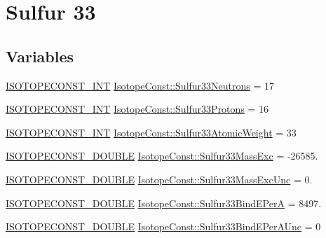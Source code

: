 \hypertarget{group___isotope_const-_sulfur-_s33}{}\section{Sulfur 33}
\label{group___isotope_const-_sulfur-_s33}
\subsection*{Variables}
\begin{DoxyCompactItemize}
\item 
\mbox{\hyperlink{group___isotope_const-_macros_ga5f18360b3e99483a35c32d789e62621c}{I\+S\+O\+T\+O\+P\+E\+C\+O\+N\+S\+T\+\_\+\+I\+NT}} \mbox{\hyperlink{group___isotope_const-_sulfur-_s33_ga18b5d01b14fd8733eec20ef9f10093d9}{Isotope\+Const\+::\+Sulfur33\+Neutrons}} = 17
\item 
\mbox{\hyperlink{group___isotope_const-_macros_ga5f18360b3e99483a35c32d789e62621c}{I\+S\+O\+T\+O\+P\+E\+C\+O\+N\+S\+T\+\_\+\+I\+NT}} \mbox{\hyperlink{group___isotope_const-_sulfur-_s33_gaa3c6580a5931a6566dbdd20283a1c02a}{Isotope\+Const\+::\+Sulfur33\+Protons}} = 16
\item 
\mbox{\hyperlink{group___isotope_const-_macros_ga5f18360b3e99483a35c32d789e62621c}{I\+S\+O\+T\+O\+P\+E\+C\+O\+N\+S\+T\+\_\+\+I\+NT}} \mbox{\hyperlink{group___isotope_const-_sulfur-_s33_ga674be6ce647896ee753c75655993103c}{Isotope\+Const\+::\+Sulfur33\+Atomic\+Weight}} = 33
\item 
\mbox{\hyperlink{group___isotope_const-_macros_ga8f45a7272ce02c0b4c65c44636ed719a}{I\+S\+O\+T\+O\+P\+E\+C\+O\+N\+S\+T\+\_\+\+D\+O\+U\+B\+LE}} \mbox{\hyperlink{group___isotope_const-_sulfur-_s33_ga17e4e2ae4d121834a5676e0c3527b830}{Isotope\+Const\+::\+Sulfur33\+Mass\+Exc}} = -\/26585.
\item 
\mbox{\hyperlink{group___isotope_const-_macros_ga8f45a7272ce02c0b4c65c44636ed719a}{I\+S\+O\+T\+O\+P\+E\+C\+O\+N\+S\+T\+\_\+\+D\+O\+U\+B\+LE}} \mbox{\hyperlink{group___isotope_const-_sulfur-_s33_gacc991e44cddcd8dbb7fb8f7b7f63c9b3}{Isotope\+Const\+::\+Sulfur33\+Mass\+Exc\+Unc}} = 0.
\item 
\mbox{\hyperlink{group___isotope_const-_macros_ga8f45a7272ce02c0b4c65c44636ed719a}{I\+S\+O\+T\+O\+P\+E\+C\+O\+N\+S\+T\+\_\+\+D\+O\+U\+B\+LE}} \mbox{\hyperlink{group___isotope_const-_sulfur-_s33_gae7157e250303582c067cb263e71d63ea}{Isotope\+Const\+::\+Sulfur33\+Bind\+E\+PerA}} = 8497.
\item 
\mbox{\hyperlink{group___isotope_const-_macros_ga8f45a7272ce02c0b4c65c44636ed719a}{I\+S\+O\+T\+O\+P\+E\+C\+O\+N\+S\+T\+\_\+\+D\+O\+U\+B\+LE}} \mbox{\hyperlink{group___isotope_const-_sulfur-_s33_gaa7c0f86449b3987cfd35e251ecfbb574}{Isotope\+Const\+::\+Sulfur33\+Bind\+E\+Per\+A\+Unc}} = 0

\end{DoxyCompactItemize}
